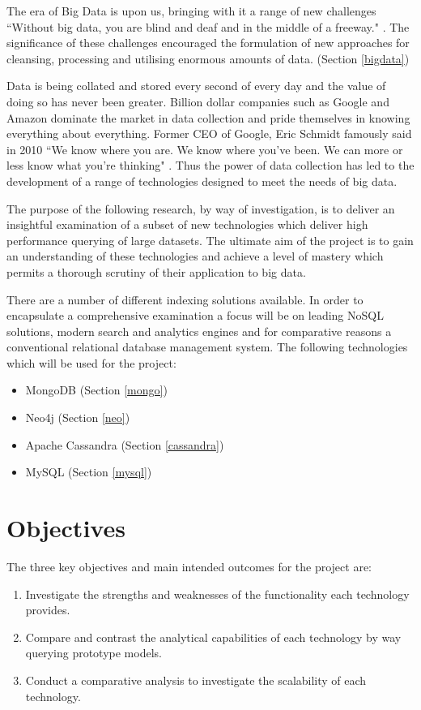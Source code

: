 The era of Big Data is upon us, bringing with it a range of new challenges ``Without big data, you are blind and deaf and in the middle of a freeway."\cite{moore} . The significance of these challenges encouraged the formulation of new approaches for cleansing, processing and utilising enormous amounts of data. (Section \ref{bigdata})

Data is being collated and stored every second of every day and the value of doing so has never been greater. Billion dollar companies such as Google and Amazon dominate the market in data collection and pride themselves in knowing everything about everything. Former CEO of Google, Eric Schmidt famously said in 2010 ``We know where you are. We know where you've been. We can more or less know what you're thinking" \cite{schmidt}. Thus the power of data collection has led to the development of a range of technologies designed to meet the needs of big data.

The purpose of the following research, by way of investigation, is to deliver an insightful examination of a subset of new technologies which deliver high performance querying of large datasets. The ultimate aim of the project is to gain an understanding of these technologies and achieve a level of mastery which permits a thorough scrutiny of their application to big data.

There are a number of different indexing solutions available. In order to encapsulate a comprehensive examination a focus will be on leading NoSQL solutions, modern search and analytics engines and for comparative reasons a conventional relational database management system. The following technologies which will be used for the project: 

\begin{itemize}
\item MongoDB (Section \ref{mongo})
\item Neo4j (Section \ref{neo})
\item Apache Cassandra (Section \ref{cassandra})
\item MySQL (Section \ref{mysql})
\end{itemize}

\section{Objectives}\label{objectives}
The three key objectives and main intended outcomes for the project are:
\begin{enumerate}
\item Investigate the strengths and weaknesses of the functionality each technology provides.
\item Compare and contrast the analytical capabilities of each technology by way querying prototype models.
\item Conduct a comparative analysis to investigate the scalability of each technology.
\end{enumerate}


